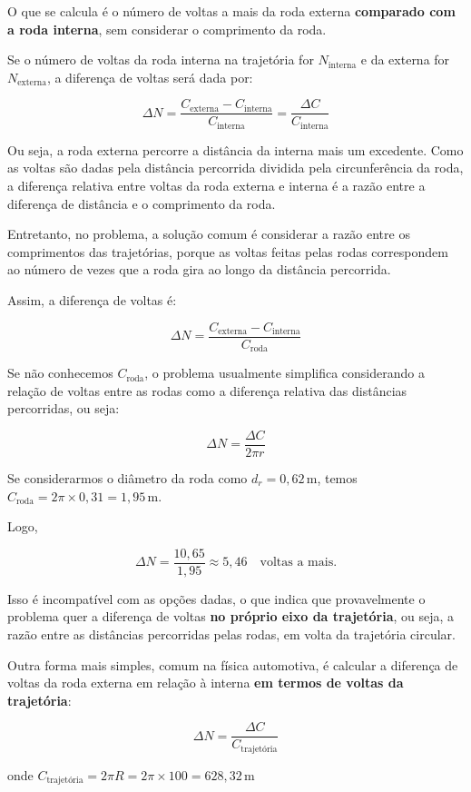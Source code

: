 \documentclass[a4paper,12pt]{article}
\begin{document}
\begin{flushleft}
O que se calcula é o número de voltas a mais da roda externa \textbf{comparado com a roda interna}, sem considerar o comprimento da roda.

Se o número de voltas da roda interna na trajetória for $N_{\text{interna}}$ e da externa for $N_{\text{externa}}$, a diferença de voltas será dada por:

\[
\Delta N = \frac{C_{\text{externa}} - C_{\text{interna}}}{C_{\text{interna}}} = \frac{\Delta C}{C_{\text{interna}}}
\]

Ou seja, a roda externa percorre a distância da interna mais um excedente. Como as voltas são dadas pela distância percorrida dividida pela circunferência da roda, a diferença relativa entre voltas da roda externa e interna é a razão entre a diferença de distância e o comprimento da roda.

Entretanto, no problema, a solução comum é considerar a razão entre os comprimentos das trajetórias, porque as voltas feitas pelas rodas correspondem ao número de vezes que a roda gira ao longo da distância percorrida.

Assim, a diferença de voltas é:

\[
\Delta N = \frac{C_{\text{externa}} - C_{\text{interna}}}{C_{\text{roda}}}
\]

Se não conhecemos $C_{\text{roda}}$, o problema usualmente simplifica considerando a relação de voltas entre as rodas como a diferença relativa das distâncias percorridas, ou seja:

\[
\Delta N = \frac{\Delta C}{2 \pi r}
\]

Se considerarmos o diâmetro da roda como $d_r = 0,62\,\text{m}$, temos $C_{\text{roda}} = 2 \pi \times 0,31 = 1,95\,\text{m}$.

Logo,

\[
\Delta N = \frac{10,65}{1,95} \approx 5,46 \quad \text{voltas a mais.}
\]

Isso é incompatível com as opções dadas, o que indica que provavelmente o problema quer a diferença de voltas \textbf{no próprio eixo da trajetória}, ou seja, a razão entre as distâncias percorridas pelas rodas, em volta da trajetória circular.

Outra forma mais simples, comum na física automotiva, é calcular a diferença de voltas da roda externa em relação à interna \textbf{em termos de voltas da trajetória}:

\[
\Delta N = \frac{\Delta C}{C_{\text{trajetória}}}
\]

onde $C_{\text{trajetória}} = 2 \pi R = 2 \pi \times 100 = 628,32\,\text{m}$


\end{flushleft}
\end{document}
